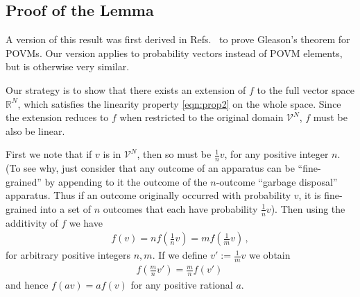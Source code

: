 \documentclass[%
 reprint,superscriptaddress,
 amsmath,amssymb,
 aps,twocolumn,pra
]{revtex4-1}
\newcommand{\eqn}[1]{\begin{eqnarray} #1 \end{eqnarray}}
\begin{document}
\begin{appendix}
\section{Proof of the Lemma \label{app:prop2}}
A version of this result was first derived in Refs.\ \cite{BUSCH, RENES} to prove Gleason's theorem for POVMs. Our version applies to probability vectors instead of POVM elements, but is otherwise very similar.

Our strategy is to show that there exists an extension of $f$ to the full vector space $\mathbb{R}^N$, which satisfies the linearity property \eqref{eqn:prop2} on the whole space. Since the extension reduces to $f$ when restricted to the original domain $\mathcal{V}^N$, $f$ must be also be linear.

First we note that if $v$ is in $\mathcal{V}^N$, then so must be $\frac{1}{n} v$, for any positive integer $n$. (To see why, just consider that any outcome of an apparatus can be ``fine-grained'' by appending to it the outcome of the $n$-outcome ``garbage disposal'' apparatus.
Thus if an outcome originally occurred with probability $v$, it is fine-grained into a set of $n$ outcomes that each have probability $\frac{1}{n} v$). Then using the additivity of $f$ we have
\eqn{
f(v) = n f\left(\frac{1}{n}  v \right)
=  m f\left(\frac{1}{m}  v \right) \, ,
}
for arbitrary positive integers $n,m$. If we define $v':= \frac{1}{m} v$ we obtain
\eqn{
f\left(\frac{m}{n}  v' \right)
=  \frac{m}{n} f\left( v' \right) \,
}
and hence $f(a v) = a f(v)$ for any positive rational $a$.


\end{appendix}
\end{document}
